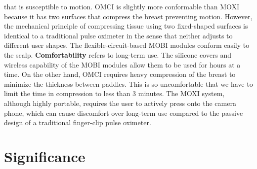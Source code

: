 that is susceptible to motion. \ac{OMCI} is slightly more conformable than \ac{MOXI} because it has two surfaces that compress the breast preventing motion. However, the mechanical principle of compressing tissue using two fixed-shaped surfaces is identical to a traditional pulse oximeter in the sense that neither adjusts to different user shapes. The flexible-circuit-based \ac{MOBI} modules conform easily to the scalp. \textbf{Comfortability} refers to long-term use. The silicone covers and wireless capability of the \ac{MOBI} modules allow them to be used for hours at a time. On the other hand, \ac{OMCI} requires heavy compression of the breast to minimize the thickness between paddles. This is so uncomfortable that we have to limit the time in compression to less than 3 minutes. The \ac{MOXI} system, although highly portable, requires the user to actively press onto the camera phone, which can cause discomfort over long-term use compared to the passive design of a traditional finger-clip pulse oximeter. 




\section{Significance}